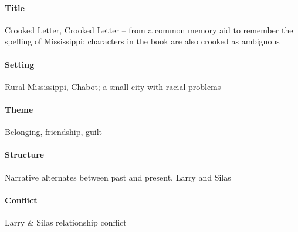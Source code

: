 \documentclass[10pt]{article}
\begin{document}
\paragraph{Title}
Crooked Letter, Crooked Letter -- from a common memory aid to remember the spelling of Mississippi; characters in the book are also crooked as ambiguous

\paragraph{Setting}
Rural Mississippi, Chabot; a small city with racial problems

\paragraph{Theme}
Belonging, friendship, guilt

\paragraph{Structure}
Narrative alternates between past and present, Larry and Silas

\paragraph{Conflict}
Larry \& Silas relationship conflict

\printntexbibliography
\end{document}
